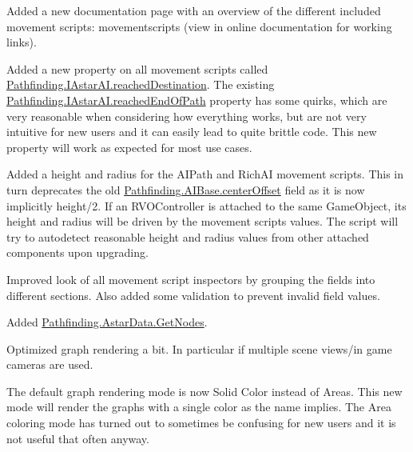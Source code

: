 \begin{DoxyItemize}
\begin{DoxyItemize}
\begin{DoxyItemize}
\item Added a new documentation page with an overview of the different included movement scripts\+: movementscripts (view in online documentation for working links).
\item Added a new property on all movement scripts called \mbox{\hyperlink{interface_pathfinding_1_1_i_astar_a_i_a9c671f788baec66af6b51c7462a53a60}{Pathfinding.\+I\+Astar\+A\+I.\+reached\+Destination}}. The existing \mbox{\hyperlink{interface_pathfinding_1_1_i_astar_a_i_a0b4009cade4a25ddc760cacb6669805e}{Pathfinding.\+I\+Astar\+A\+I.\+reached\+End\+Of\+Path}} property has some quirks, which are very reasonable when considering how everything works, but are not very intuitive for new users and it can easily lead to quite brittle code. This new property will work as expected for most use cases.
\item Added a height and radius for the A\+I\+Path and Rich\+AI movement scripts. This in turn deprecates the old \mbox{\hyperlink{class_pathfinding_1_1_a_i_base_a8316799eae5218bc12b14920c8f2bd1a}{Pathfinding.\+A\+I\+Base.\+center\+Offset}} field as it is now implicitly height/2. If an R\+V\+O\+Controller is attached to the same Game\+Object, its height and radius will be driven by the movement script\textquotesingle{}s values. The script will try to autodetect reasonable height and radius values from other attached components upon upgrading.
\item Improved look of all movement script inspectors by grouping the fields into different sections. Also added some validation to prevent invalid field values.
\item Added \mbox{\hyperlink{class_pathfinding_1_1_astar_data_a21b0e75ff4aa8af66025f06684f4e6df}{Pathfinding.\+Astar\+Data.\+Get\+Nodes}}.
\item Optimized graph rendering a bit. In particular if multiple scene views/in game cameras are used.
\item The default graph rendering mode is now \textquotesingle{}Solid Color\textquotesingle{} instead of \textquotesingle{}Areas\textquotesingle{}. This new mode will render the graphs with a single color as the name implies. The Area coloring mode has turned out to sometimes be confusing for new users and it is not useful that often anyway.

\end{DoxyItemize}
\end{DoxyItemize}
\end{DoxyItemize}
